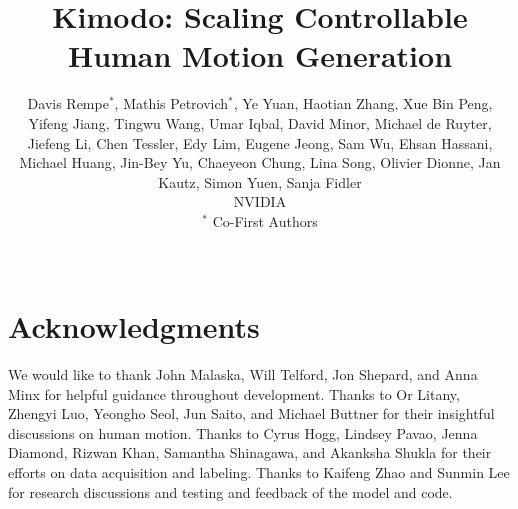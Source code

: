 \documentclass[10pt,logo,copyright]{nvidiatechreport}
\title{Kimodo: Scaling Controllable Human Motion Generation}
\begin{document}
\author{
    Davis Rempe$^\ast$,
    Mathis Petrovich$^\ast$,
    Ye Yuan,
    Haotian Zhang,
    Xue Bin Peng,
    Yifeng Jiang,
    Tingwu Wang,
    Umar Iqbal, 
    David Minor,
    Michael de Ruyter,
    Jiefeng Li,
    Chen Tessler,
    Edy Lim, 
    Eugene Jeong, 
    Sam Wu, 
    Ehsan Hassani,
    Michael Huang,
    Jin-Bey Yu,
    Chaeyeon Chung,
    Lina Song, 
    Olivier Dionne,
    Jan Kautz,
    Simon Yuen,
    Sanja Fidler
    \\
	\small NVIDIA \\
    \small$^\ast$ Co-First Authors \\
    \small \tt{\href{\link}{\link}}
}






\maketitle
\newcommand{\todo}[1]{\textcolor{red}{ [TODO: \textbf{#1}]}}
\newcommand{\davis}[1]{\textcolor{green}{ [Davis: \textbf{#1}]}}
\newcommand{\mathis}[1]{\textcolor{teal}{ [Mathis: \textbf{#1}]}}
\newcommand{\jason}[1]{\textcolor{blue}{ [Jason: \textbf{#1}]}}


\abscontent










\clearpage %










\appendix
\newpage
\clearpage

\section{Acknowledgments}
We would like to thank John Malaska, Will Telford, Jon Shepard, and Anna Minx for helpful guidance throughout development. Thanks to Or Litany, Zhengyi Luo, Yeongho Seol, Jun Saito, and Michael Buttner for their insightful discussions on human motion. Thanks to Cyrus Hogg, Lindsey Pavao, Jenna Diamond, Rizwan Khan, Samantha Shinagawa, and Akanksha Shukla for their efforts on data acquisition and labeling. Thanks to Kaifeng Zhao and Sunmin Lee for research discussions and testing and feedback of the model and code.
\end{document}
